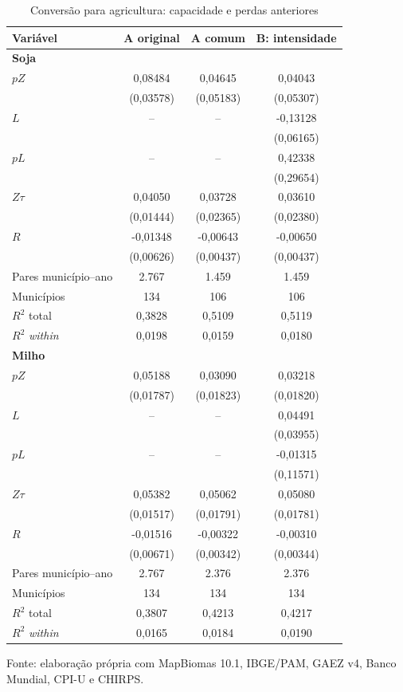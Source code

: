 \begin{table}[htbp]
\centering
\small
\setlength{\tabcolsep}{3pt}
\renewcommand{\arraystretch}{1.1}
\normalcaption\captionstyle{\centering}
\caption{Conversão para agricultura: capacidade e perdas anteriores}
\label{tab:h1-principais}
\begin{tabular}{lccc}
\hline
Variável & A original & A comum & B: intensidade \\
\hline\multicolumn{4}{l}{\textbf{Soja}} \\
$pZ$ & 0,08484 & 0,04645 & 0,04043 \\
 & (0,03578) & (0,05183) & (0,05307) \\
$L$ & -- & -- & -0,13128 \\
 &  &  & (0,06165) \\
$pL$ & -- & -- & 0,42338 \\
 &  &  & (0,29654) \\
$Z\tau$ & 0,04050 & 0,03728 & 0,03610 \\
 & (0,01444) & (0,02365) & (0,02380) \\
$R$ & -0,01348 & -0,00643 & -0,00650 \\
 & (0,00626) & (0,00437) & (0,00437) \\
Pares município--ano & 2.767 & 1.459 & 1.459 \\
Municípios & 134 & 106 & 106 \\
$R^2$ total & 0,3828 & 0,5109 & 0,5119 \\
$R^2$ \textit{within} & 0,0198 & 0,0159 & 0,0180 \\
\hline\multicolumn{4}{l}{\textbf{Milho}} \\
$pZ$ & 0,05188 & 0,03090 & 0,03218 \\
 & (0,01787) & (0,01823) & (0,01820) \\
$L$ & -- & -- & 0,04491 \\
 &  &  & (0,03955) \\
$pL$ & -- & -- & -0,01315 \\
 &  &  & (0,11571) \\
$Z\tau$ & 0,05382 & 0,05062 & 0,05080 \\
 & (0,01517) & (0,01791) & (0,01781) \\
$R$ & -0,01516 & -0,00322 & -0,00310 \\
 & (0,00671) & (0,00342) & (0,00344) \\
Pares município--ano & 2.767 & 2.376 & 2.376 \\
Municípios & 134 & 134 & 134 \\
$R^2$ total & 0,3807 & 0,4213 & 0,4217 \\
$R^2$ \textit{within} & 0,0165 & 0,0184 & 0,0190 \\
\hline\end{tabular}
\par\smallskip
\begin{minipage}{\textwidth}\footnotesize\centering
Fonte: elaboração própria com MapBiomas 10.1, IBGE/PAM, GAEZ v4, Banco Mundial, CPI-U e CHIRPS.
\end{minipage}
\end{table}
